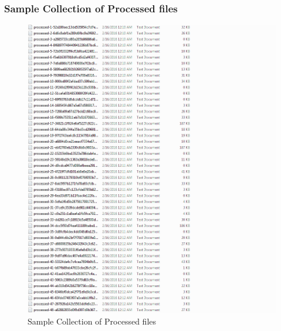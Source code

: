 \subsubsection{Sample Collection of Processed files}
\begin{figure}[ht]    
    \begin{center}
        \includegraphics[scale=0.6]{process_coll.png}
        \caption{Sample Collection of Processed files}
        \label{Sample Collection of Processed files}
    \end{center}
\end{figure}
\newpage
